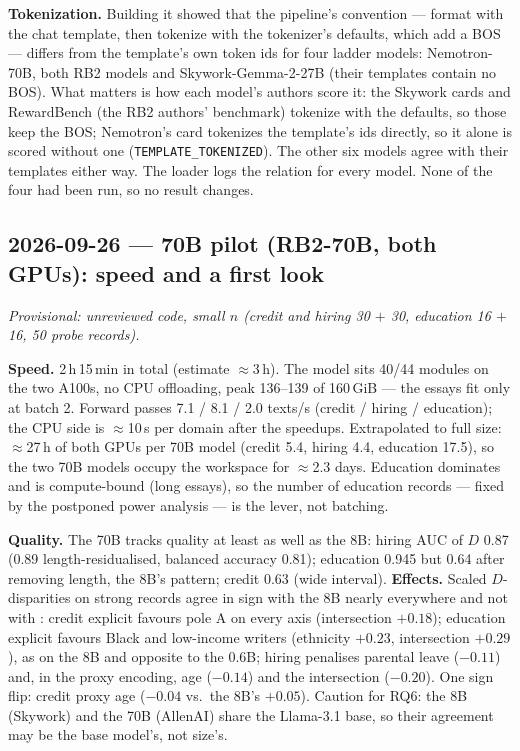\documentclass{article}
\begin{document}
\textbf{Tokenization.} Building it showed that the pipeline's convention --- format with the chat template, then
tokenize with the tokenizer's defaults, which add a BOS --- differs from the template's own token ids for four
ladder models: Nemotron-70B, both RB2 models and Skywork-Gemma-2-27B (their templates contain no BOS). What matters
is how each model's authors score it: the Skywork cards and RewardBench (the RB2 authors' benchmark) tokenize with
the defaults, so those keep the BOS; Nemotron's card tokenizes the template's ids directly, so it alone is scored
without one (\texttt{TEMPLATE\_TOKENIZED}). The other six models agree with their templates either way. The loader
logs the relation for every model. None of the four had been run, so no result changes.

\subsection*{2026-09-26 --- 70B pilot (RB2-70B, both GPUs): speed and a first look}
\emph{Provisional: unreviewed code, small $n$ (credit and hiring 30 $+$ 30, education 16 $+$ 16, 50 probe records).}

\textbf{Speed.} 2\,h\,15\,min in total (estimate $\approx$3\,h). The model sits 40/44 modules on the two A100s, no
CPU offloading, peak 136--139 of 160\,GiB --- the essays fit only at batch 2. Forward passes 7.1 / 8.1 / 2.0 texts/s
(credit / hiring / education); the CPU side is $\approx$10\,s per domain after the speedups. Extrapolated to full
size: $\approx$27\,h of both GPUs per 70B model (credit 5.4, hiring 4.4, education 17.5), so the two 70B models
occupy the workspace for $\approx$2.3 days. Education dominates and is compute-bound (long essays), so the number of
education records --- fixed by the postponed power analysis --- is the lever, not batching.

\textbf{Quality.} The 70B tracks quality at least as well as the 8B: hiring AUC of $D$ 0.87 (0.89 length-residualised,
balanced accuracy 0.81); education 0.945 but 0.64 after removing length, the 8B's pattern; credit 0.63 (wide
interval). \textbf{Effects.} Scaled $D$-disparities on strong records agree in sign with the 8B nearly everywhere
and not with \modelSmall{}: credit explicit favours pole A on every axis (intersection $+0.18$); education explicit
favours Black and low-income writers (ethnicity $+0.23$, intersection $+0.29$), as on the 8B and opposite to the 0.6B;
hiring penalises parental leave ($-0.11$) and, in the proxy encoding, age ($-0.14$) and the intersection ($-0.20$).
One sign flip: credit proxy age ($-0.04$ vs.\ the 8B's $+0.05$). Caution for RQ6: the 8B (Skywork) and the 70B
(AllenAI) share the Llama-3.1 base, so their agreement may be the base model's, not size's.
\end{document}

